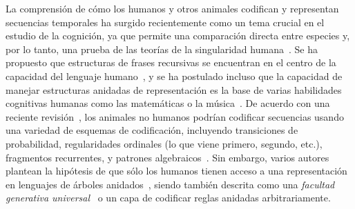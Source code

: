
La comprensión de cómo los humanos y otros animales codifican y representan secuencias temporales ha surgido recientemente como un tema crucial en el estudio de la cognición, ya que permite una comparación directa entre especies y, por lo tanto, una prueba de las teorías de la singularidad humana~\cite{f4,f5}. Se ha propuesto que estructuras de frases recursivas se encuentran en el centro de la capacidad del lenguaje humano~\cite{f6}, y se ha postulado incluso que la capacidad de manejar estructuras anidadas de representación es la base de varias habilidades cognitivas humanas como las matemáticas o la música~\cite{f4,f7,f8,f9}. De acuerdo con una reciente revisión~\cite{f4}, los animales no humanos podrían codificar secuencias usando una variedad de esquemas de codificación, incluyendo transiciones de probabilidad, regularidades ordinales (lo que viene primero, segundo, etc.), fragmentos recurrentes, y patrones algebraicos~\cite{f10,f11,f12,f13,f14}. Sin embargo, varios autores plantean la hipótesis de que sólo los humanos tienen acceso a una representación en lenguajes de árboles anidados~\cite{f4,f8}, siendo también descrita como una \textit{facultad generativa universal}~\cite{f9} o un \lot capa de codificar reglas anidadas arbitrariamente.

